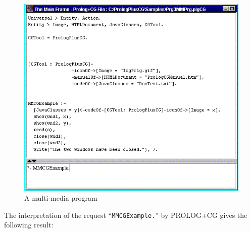 \documentclass{book}
\begin{document}
\begin{htmlonly}

\begin{figure}
\begin{center}
\includegraphics{MMPrg.png}
\end{center}
\caption{\label{MMPrg}A multi-media program}
\end{figure}

\end{htmlonly}


The interpretation of the request ``\texttt{MMCGExample.}'' by
PROLOG+CG gives the following result:
\end{document}
